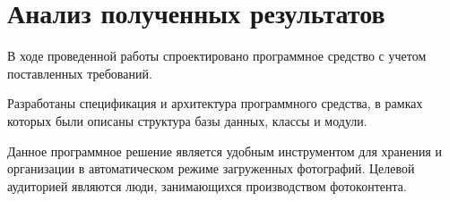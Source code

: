 \section{Анализ полученных результатов}

В ходе проведенной работы спроектировано программное средство с учетом поставленных требований. 

Разработаны спецификация и архитектура программного средства, в рамках которых были описаны структура базы данных, классы и модули.

Данное программное решение является удобным инструментом для хранения и организации в автоматическом режиме загруженных фотографий. Целевой аудиторией являются люди, занимающихся производством фотоконтента.

\clearpage
